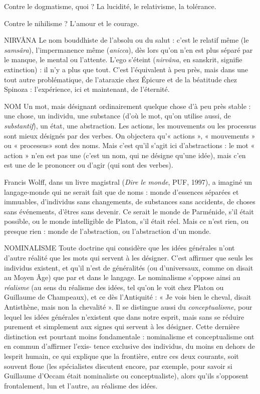 Contre le dogmatisme, quoi ? La lucidité, le relativisme, la tolérance.

Contre le nihilisme ? L’amour et le courage.

NIRVÂNA Le nom bouddhiste de l’absolu ou du salut : c’est le relatif même
(le {\it samsâra}), l'impermanence même ({\it anicca}), dès lors qu’on n’en
est plus séparé par le manque, le mental ou l'attente. L’ego s'éteint ({\it nirvâna}, en
sanskrit, signifie extinction) : il n’y a plus que tout. C’est l'équivalent à peu
près, mais dans une tout autre problématique, de l’ataraxie chez Épicure et de
la béatitude chez Spinoza : l'expérience, ici et maintenant, de l’éternité.

NOM Un mot, mais désignant ordinairement quelque chose d’à peu près
stable : une chose, un individu, une substance (d’où le mot, qu’on utilise
aussi, de {\it substantif}), un état, une abstraction. Les actions, les mouvements
ou les processus sont mieux désignés par des verbes. On objectera qu’« actions »,
« mouvements » ou « processus» sont des noms. Mais c’est qu'il s’agit ici
d’abstractions : le mot « action » n’en est pas une (c’est un nom, qui ne désigne
qu’une idée), mais c’en est une de le prononcer ou d’agir (qui sont des verbes).

Francis Wolff, dans un livre magistral ({\it Dire le monde}, PUF, 1997), a imaginé
un langage-monde qui ne serait fait que de noms : monde d’essences séparées et
immuables, d'individus sans changements, de substances sans accidents, de
choses sans événements, d’êtres sans devenir. Ce serait le monde de Parménide,
s’il était possible, ou le monde intelligible de Platon, s’il était réel. Mais ce n’est
rien, ou presque rien : monde de l’abstraction, ou l’abstraction d’un monde.

NOMINALISME Toute doctrine qui considère que les idées générales n’ont
d’autre réalité que les mots qui servent à les désigner.
C’est affirmer que seuls les individus existent, et qu’il n’est de généralités (ou
d’universaux, comme on disait au Moyen Âge) que par et dans le langage. Le
nominalisme s'oppose ainsi au {\it réalisme} (au sens du réalisme des idées, tel qu’on
le voit chez Platon ou Guillaume de Champeaux), et ce dès l’Antiquité : « Je
vois bien le cheval, disait Antisthène, mais non la chevalité ». Il se distingue
aussi du {\it conceptualisme}, pour lequel les idées générales n'existent que dans
notre esprit, mais sans se réduire purement et simplement aux signes qui servent
à les désigner. Cette dernière distinction est pourtant moins fondamentale :
nominalisme et conceptualisme ont en commun d’affirmer l’exis-
tence exclusive des individus, du moins en dehors de lesprit humain, ce qui
explique que la frontière, entre ces deux courants, soit souvent floue (les spécialistes
discutent encore, par exemple, pour savoir si Guillaume d’Occam était
nominaliste ou conceptualiste), alors qu’ils s'opposent frontalement, lun et
l’autre, au réalisme des idées.

